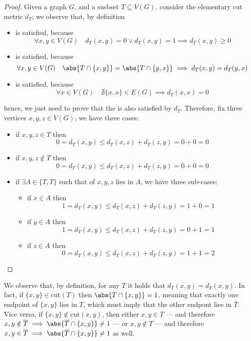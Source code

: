 \documentclass[a4paper, 12pt]{report}
\begin{document}
    \begin{proof}
        Given a graph $G$, and a susbset $T \subseteq V(G)$, consider the elementary cut metric $d_T$; we observe that, by definition

        \begin{itemize}
            \item {} is satisfied, because $$\forall x, y \in V(G) \quad d_T(x, y) = 0 \lor d_T(x, y) = 1 \implies d_T(x, y) \ge 0$$
            \item {} is satisfied, because $$\forall x, y \in V(G) \quad \abs{T \cap \{x, y\}} = \abs{T \cap \{y, x\}} \implies d_T(x, y) = d_T(y, x)$$
            \item {} is satisfied, because $$\forall x \in V(G) \quad \nexists \{x, x\} \in E(G) \implies d_T(x, x) =0$$
        \end{itemize}
        
        hence, we just need to prove that the  is also satisfied by $d_T$. Therefore, fix three vertices $x, y, z \in V(G)$; we have three cases:

        \begin{itemize}
            \item if $x, y, z \in T$ then $$0 = d_T(x, y) \le d_T(x, z) + d_T(z, y) = 0 + 0 = 0$$
            \item if $x, y, z \notin T$ then $$0 = d_T(x, y) \le d_T(x, z) + d_T(z, y) = 0 + 0 = 0$$
            \item if $\exists A \in \{T, \overline T\}$ such that  of $x, y, z$ lies in $A$, we have three sub-cases:
                \begin{itemize}
                    \item if $x \in A$ then $$1 = d_T(x, y) \le d_T(x, z) + d_T(z, y) = 1 + 0 = 1$$
                    \item if $y \in A$ then $$1 = d_T(x, y) \le d_T(x, z) + d_T(z, y) = 0 + 1 = 1$$
                    \item if $z \in A$ then $$0 = d_T(x, y) \le d_T(x, z) + d_T(z, y) = 1 + 1 = 2$$
                \end{itemize}
        \end{itemize}
    \end{proof}

    We observe that, by definition, for any $T$ it holds that $d_T(x, y) = d_{\overline T}(x, y)$. In fact, if $\{x, y\} \in \mathrm{cut}(T)$ then $\abs{T \cap \{x, y\}} = 1$, meaning that exactly one endpoint of $\{x, y\}$ lies in $T$, which must imply that the other endpont lies in $\overline T$. Vice versa, if $\{x, y\} \notin \mathrm{cut}(x, y)$, then either $x, y \in T$ --- and therefore $x, y \notin \overline T \implies \abs{\overline T \cap \{x, y\}} \neq 1$ --- or $x, y \notin T$ --- and therefore $x, y \in \overline T \implies \abs{\overline T \cap \{x, y\}} \neq 1$ as well.
\end{document}
